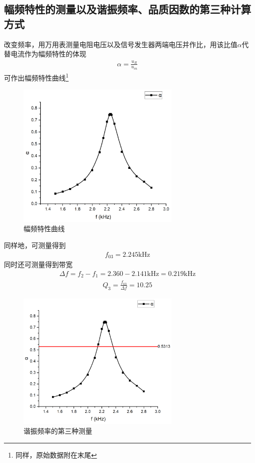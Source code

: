 \documentclass[a4paper]{ctexart}
\begin{document}
	\subsection{幅频特性的测量以及谐振频率、品质因数的第三种计算方式}
	改变频率，用万用表测量电阻电压以及信号发生器两端电压并作比，用该比值$\alpha$代替电流作为幅频特性的体现
	\begin{align}
		\alpha=\frac{u_R}{u_{in}}
	\end{align}
	可作出幅频特性曲线\footnote{同样，原始数据附在末尾}
	\begin{figure}[H]
		\centering
		\includegraphics[width=8cm]{alpha.png}
		\caption{幅频特性曲线}
	\end{figure}
	同样地，可测量得到
	\begin{align}
		f_{03}=2.245\mathrm{kHz}
	\end{align}
	同时还可测量得到带宽
	\begin{align}
		\Delta f=f_2-f_1=2.360-2.141\mathrm{kHz}=0.219\mathrm{kHz}
	\end{align}
	\begin{align}
		Q_3=\frac{f_{03}}{\Delta f}=10.25
	\end{align}
	\begin{figure}[H]
		\centering
		\includegraphics[width=8cm]{alpha1.png}
		\caption{谐振频率的第三种测量}
	\end{figure}
\end{document}

